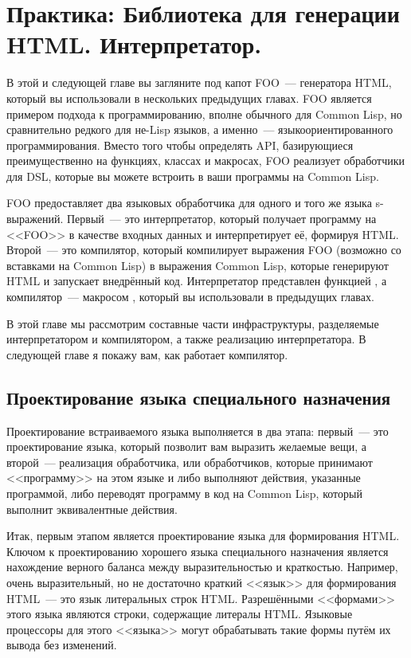 \chapter{Практика: Библиотека для генерации HTML. Интерпретатор.}
\label{ch:30}

В этой и следующей главе вы загляните под капот FOO~--- генератора HTML, который вы
использовали в нескольких предыдущих главах. FOO является примером подхода к
программированию, вполне обычного для Common Lisp, но сравнительно редкого для не-Lisp
языков, а именно~--- языкоориентированного программирования. Вместо того чтобы определять
API, базирующиеся преимущественно на функциях, классах и макросах, FOO реализует
обработчики для DSL,
которые вы можете встроить в ваши программы на Common Lisp.

FOO предоставляет два языковых обработчика для одного и того же языка
s-выражений. Первый~--- это интерпретатор, который получает программу на <<FOO>> в качестве
входных данных и интерпретирует её, формируя HTML. Второй~--- это компилятор, который
компилирует выражения FOO (возможно со вставками на Common Lisp) в выражения Common Lisp,
которые генерируют HTML и запускает внедрённый код. Интерпретатор представлен функцией
, а компилятор~--- макросом , который вы использовали в
предыдущих главах.

В этой главе мы рассмотрим составные части инфраструктуры, разделяемые интерпретатором и
компилятором, а также реализацию интерпретатора. В следующей главе я покажу вам, как
работает компилятор.

\section{Проектирование языка специального назначения}

Проектирование встраиваемого языка выполняется в два этапа: первый~--- это проектирование
языка, который позволит вам выразить желаемые вещи, а второй~--- реализация обработчика,
или обработчиков, которые принимают <<программу>> на этом языке и либо выполняют действия,
указанные программой, либо переводят программу в код на Common Lisp, который выполнит
эквивалентные действия.

Итак, первым этапом является проектирование языка для формирования HTML. Ключом к
проектированию хорошего языка специального назначения является нахождение верного баланса
между выразительностью и краткостью. Например, очень выразительный, но не достаточно
краткий <<язык>> для формирования HTML~--- это язык литеральных строк HTML. Разрешёнными
<<формами>> этого языка являются строки, содержащие литералы HTML.  Языковые процессоры
для этого <<языка>> могут обрабатывать такие формы путём их вывода без изменений.

